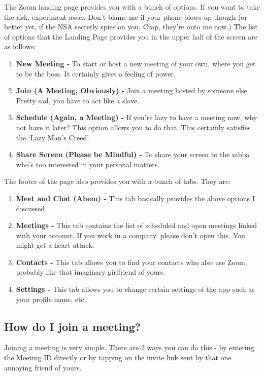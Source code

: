 \documentclass[14pt]{report}
\begin{document}
                        The Zoom landing page provides you with a bunch of options. If you want to take the risk, experiment away. Don't blame me if your phone blows up though (or better yet, if the NSA secretly spies on you. Crap, they're onto me now.) The list of options that the Landing Page provides you in the upper half of the screen are as follows:
                        \begin{enumerate}
                            \item \textbf{New Meeting - }To start or host a new meeting of your own, where you get to be the boss. It certainly gives a feeling of power.
                            \item \textbf{Join (A Meeting, Obviously) - }Join a meeting hosted by someone else. Pretty sad, you have to act like a slave.
                            \item \textbf{Schedule (Again, a Meeting) - }If you're lazy to have a meeting now, why not have it later? This option allows you to do that. This certainly satisfies the `Lazy Man's Creed'.
                            \item \textbf{Share Screen (Please be Mindful) - }To share your screen to the nibba who's too interested in your personal matters.
                        \end{enumerate}

                        The footer of the page also provides you with a bunch of tabs. They are:
                        \begin{enumerate}
                            \item \textbf{Meet and Chat (Ahem) - }This tab basically provides the above options I discussed.
                            \item \textbf{Meetings - }This tab contains the list of scheduled and open meetings linked with your account. If you work in a company, please don't open this. You might get a heart attack.
                            \item \textbf{Contacts - }This tab allows you to find your contacts who also use Zoom, probably like that imaginary girlfriend of yours.
                            \item \textbf{Settings - }This tab allows you to change certain settings of the app such as your profile name, etc.
                        \end{enumerate}

                    \subsection{How do I join a meeting?}
                        Joining a meeting is very simple. There are 2 ways you can do this - by entering the Meeting ID directly or by tapping on the invite link sent by that one annoying friend of yours.
\end{document}
